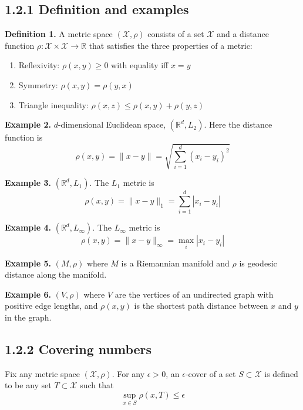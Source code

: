 \documentclass{article}
\begin{document}
\subsection*{1.2.1 Definition and examples}

\textbf{Definition 1.} A metric space $(\mathcal{X}, \rho)$ consists of a set $\mathcal{X}$ and a distance function $\rho: \mathcal{X} \times \mathcal{X} \rightarrow \mathbb{R}$ that satisfies the three properties of a metric:
\begin{enumerate}
    \item Reflexivity: $\rho(x, y) \geq 0$ with equality iff $x=y$
    \item Symmetry: $\rho(x, y)=\rho(y, x)$
    \item Triangle inequality: $\rho(x, z) \leq \rho(x, y)+\rho(y, z)$
\end{enumerate}

\textbf{Example 2.} $d$-dimensional Euclidean space, $(\mathbb{R}^{d}, L_{2})$. Here the distance function is
\begin{equation*}
\rho(x, y)=\|x-y\|=\sqrt{\sum_{i=1}^{d}\left(x_{i}-y_{i}\right)^{2}}
\end{equation*}

\textbf{Example 3.} $(\mathbb{R}^{d}, L_{1})$. The $L_{1}$ metric is
\begin{equation*}
\rho(x, y)=\|x-y\|_{1}=\sum_{i=1}^{d}\left|x_{i}-y_{i}\right|
\end{equation*}

\textbf{Example 4.} $(\mathbb{R}^{d}, L_{\infty})$. The $L_{\infty}$ metric is
\begin{equation*}
\rho(x, y)=\|x-y\|_{\infty}=\max _{i}\left|x_{i}-y_{i}\right|
\end{equation*}

\textbf{Example 5.} $(M, \rho)$ where $M$ is a Riemannian manifold and $\rho$ is geodesic distance along the manifold.

\textbf{Example 6.} $(V, \rho)$ where $V$ are the vertices of an undirected graph with positive edge lengths, and $\rho(x, y)$ is the shortest path distance between $x$ and $y$ in the graph.

\subsection*{1.2.2 Covering numbers}

Fix any metric space $(\mathcal{X}, \rho)$. For any $\epsilon>0$, an $\epsilon$-cover of a set $S \subset \mathcal{X}$ is defined to be any set $T \subset \mathcal{X}$ such that
\begin{equation*}
\sup _{x \in S} \rho(x, T) \leq \epsilon
\end{equation*}
\end{document}
